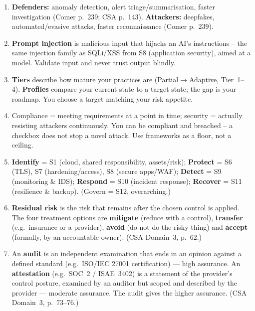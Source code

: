 \documentclass[11pt]{article}
\renewcommand{\emph}[1]{\textup{#1}}
\begin{document}
\begin{enumerate}
      automation failures (any two). Keep humans in the loop for high-impact actions.
\item \textbf{Defenders:} anomaly detection, alert triage/summarisation, faster investigation (Comer
      p.~239; CSA p.~143). \textbf{Attackers:} deepfakes, automated/evasive attacks, faster
      reconnaissance (Comer p.~239).
\item \textbf{Prompt injection} is malicious input that hijacks an AI's instructions -- the same
      \emph{injection} family as SQLi/XSS from S8 (application security), aimed at a model. Validate input
      and never trust output blindly.
\item \textbf{Tiers} describe how mature your practices are (Partial$\rightarrow$Adaptive, Tier~1--4).
      \textbf{Profiles} compare your \emph{current} state to a \emph{target} state; the gap is your
      roadmap. You choose a target matching your risk appetite.
\item Compliance = meeting requirements at a point in time; security = actually resisting attackers
      continuously. You can be compliant and breached -- a checkbox does not stop a novel attack. Use
      frameworks as a floor, not a ceiling.
\item \textbf{Identify} = S1 (cloud, shared responsibility, assets/risk); \textbf{Protect} = S6 (TLS),
      S7 (hardening/access), S8 (secure apps/WAF); \textbf{Detect} = S9 (monitoring \& IDS);
      \textbf{Respond} = S10 (incident response); \textbf{Recover} = S11 (resilience \& backup).
      (Govern = S12, overarching.)
\item \textbf{Residual risk} is the risk that remains after the chosen control is applied. The four
      treatment options are \textbf{mitigate} (reduce with a control), \textbf{transfer} (e.g.\ insurance
      or a provider), \textbf{avoid} (do not do the risky thing) and \textbf{accept} (formally, by an
      accountable owner). (CSA Domain~3, p.~62.)
\item An \textbf{audit} is an independent examination that ends in an opinion against a defined standard
      (e.g.\ ISO/IEC 27001 certification) --- high assurance. An \textbf{attestation} (e.g.\ SOC~2 /
      ISAE~3402) is a statement of the provider's control posture, examined by an auditor but scoped and
      described by the provider --- moderate assurance. The audit gives the higher assurance.
      (CSA Domain~3, p.~73--76.)
\end{enumerate}
\end{document}
